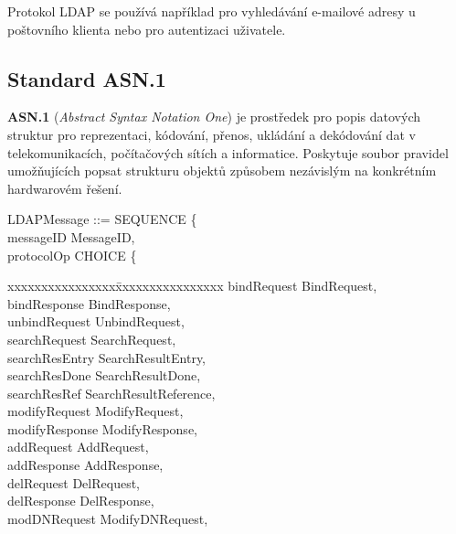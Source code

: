 \documentclass[a4paper, 11pt]{article}
\newcommand{\tab}[1][1cm]{\hspace*{#1}}
\newenvironment{envtt}{\ttfamily}{\par}
\begin{document}
Protokol LDAP se používá například pro vyhledávání e-mailové adresy u poštovního klienta nebo pro autentizaci uživatele.

\pagebreak


\subsection{Standard ASN.1}

\textbf{ASN.1} (\textit{Abstract Syntax Notation One}) je prostředek pro popis datových struktur pro reprezentaci, kódování, přenos, ukládání a dekódování dat v telekomunikacích, počítačových sítích a informatice. Poskytuje soubor pravidel umožňujících popsat strukturu objektů způsobem nezávislým na konkrétním hardwarovém řešení. \cite{wiki_asn1}

\begin{center}
\begin{minipage}{.7\textwidth}
\begin{flushleft}
\begin{envtt}
	LDAPMessage ::= SEQUENCE \{	\\
\tab	messageID       MessageID, \\
\tab	protocolOp      CHOICE \{ \\
\begin{tabbing}
	\tab\tab xxxxxxxxxxxxxxxx\quad	\= xxxxxxxxxxxxxxxx			\kill
	\tab\tab bindRequest    \> BindRequest, \\
	\tab\tab bindResponse   \> BindResponse, \\
	\tab\tab unbindRequest  \> UnbindRequest, \\
	\tab\tab searchRequest  \> SearchRequest, \\
	\tab\tab searchResEntry \> SearchResultEntry, \\
	\tab\tab searchResDone  \> SearchResultDone, \\
	\tab\tab searchResRef   \> SearchResultReference, \\
	\tab\tab modifyRequest  \> ModifyRequest, \\
	\tab\tab modifyResponse \> ModifyResponse, \\
	\tab\tab addRequest     \> AddRequest, \\
	\tab\tab addResponse    \> AddResponse, \\
	\tab\tab delRequest     \> DelRequest, \\
	\tab\tab delResponse    \> DelResponse, \\
	\tab\tab modDNRequest   \> ModifyDNRequest, \\

\end{tabbing}
\end{envtt}
\end{flushleft}
\end{minipage}
\end{center}
\end{document}

